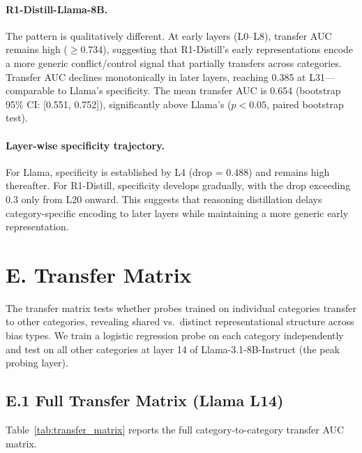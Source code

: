 \documentclass{article}
\begin{document}
\paragraph{R1-Distill-Llama-8B.}
The pattern is qualitatively different.  At early layers (L0--L8),
transfer AUC remains high ($\geq$0.734), suggesting that R1-Distill's
early representations encode a more generic conflict/control signal
that partially transfers across categories.  Transfer AUC declines
monotonically in later layers, reaching 0.385 at L31---comparable to
Llama's specificity.  The mean transfer AUC is 0.654 (bootstrap 95\%
CI: [0.551, 0.752]), significantly above Llama's ($p < 0.05$, paired
bootstrap test).

\paragraph{Layer-wise specificity trajectory.}
For Llama, specificity is established by L4 (drop = 0.488) and
remains high thereafter.  For R1-Distill, specificity develops
gradually, with the drop exceeding 0.3 only from L20 onward.  This
suggests that reasoning distillation delays category-specific encoding
to later layers while maintaining a more generic early representation.


\section*{E. Transfer Matrix}
\label{sec:appendix_transfer}

The transfer matrix tests whether probes trained on individual
categories transfer to other categories, revealing shared vs.\
distinct representational structure across bias types.  We train a
logistic regression probe on each category independently and test on
all other categories at layer 14 of Llama-3.1-8B-Instruct (the peak
probing layer).

\subsection*{E.1 Full Transfer Matrix (Llama L14)}

Table~\ref{tab:transfer_matrix} reports the full category-to-category
transfer AUC matrix.
\end{document}
